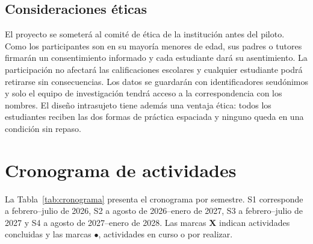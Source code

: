 \documentclass[12pt]{article}
\theoremstyle{definition}
\begin{document}
\subsection{Consideraciones éticas}

El proyecto se someterá al comité de ética de la institución antes del piloto. Como los participantes son en su mayoría menores de edad, sus padres o tutores firmarán un consentimiento informado y cada estudiante dará su asentimiento. La participación no afectará las calificaciones escolares y cualquier estudiante podrá retirarse sin consecuencias. Los datos se guardarán con identificadores seudónimos y solo el equipo de investigación tendrá acceso a la correspondencia con los nombres. El diseño intrasujeto tiene además una ventaja ética: todos los estudiantes reciben las dos formas de práctica espaciada y ninguno queda en una condición sin repaso.

\section{Cronograma de actividades}
\label{sec:cronograma}

La Tabla~\ref{tab:cronograma} presenta el cronograma por semestre. S1 corresponde a febrero--julio de 2026, S2 a agosto de 2026--enero de 2027, S3 a febrero--julio de 2027 y S4 a agosto de 2027--enero de 2028. Las marcas \textbf{X} indican actividades concluidas y las marcas $\bullet$, actividades en curso o por realizar.
\end{document}
